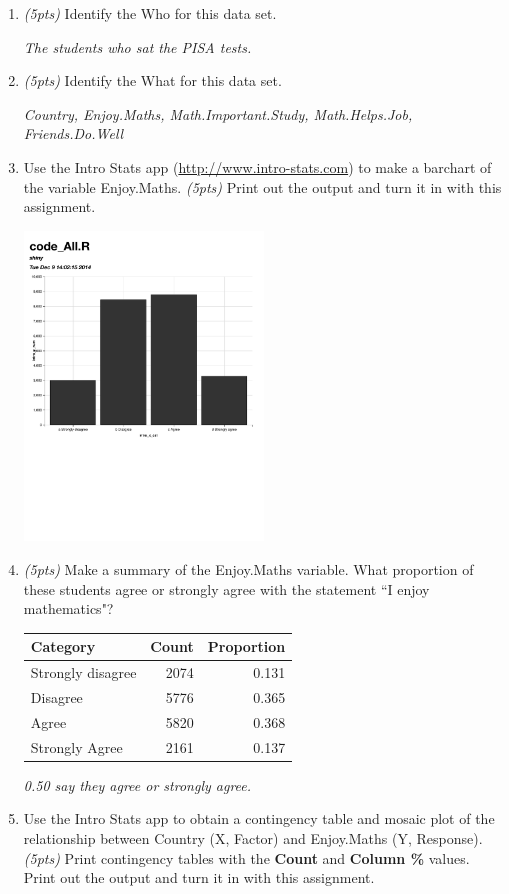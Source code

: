 \documentclass{article}
\begin{document}
\begin{enumerate}
\item {\em (5pts)} Identify the Who for this data set.

{\em The students who sat the PISA tests.}

\item {\em (5pts)} Identify the What for this data set.

{\em Country, Enjoy.Maths, Math.Important.Study, Math.Helps.Job, Friends.Do.Well}

\item Use the Intro Stats app (\url{http://www.intro-stats.com}) to make a barchart of the variable Enjoy.Maths.  
{\em (5pts)} Print out the output and turn it in with this assignment.

\centerline{\includegraphics[width=2.5in]{barchart.pdf}}

\item {\em (5pts)} Make a summary of the Enjoy.Maths variable. What proportion of these students agree or strongly agree with the statement ``I enjoy mathematics"?

\begin{tabular}{lrr}
Category & Count & Proportion \\\hline
Strongly disagree & 2074 & 0.131\\
Disagree & 5776 & 0.365 \\
Agree & 5820 &0.368 \\
Strongly Agree & 2161 & 0.137\\
\end{tabular}

{\em 0.50 say they agree or strongly agree.}

\item Use the Intro Stats app to obtain a contingency table and mosaic plot of the relationship between Country (X, Factor) and Enjoy.Maths (Y, Response).  
{\em (5pts)} Print contingency tables with the {\bf Count} and {\bf Column \%} values.  Print out the output and turn it in with this assignment. \\


\end{enumerate}
\end{document}
